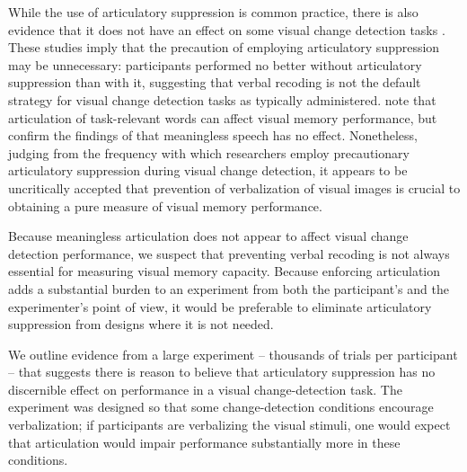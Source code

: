 While the use of articulatory suppression is common practice, there is also evidence that it does not have an effect on some visual change detection tasks \citep{Luria:etal:2010,Morey:Cowan:2004, Morey:Cowan:2005}. These studies imply that the precaution of employing articulatory suppression may be unnecessary: participants performed no better without articulatory suppression than with it, suggesting that verbal recoding is not the default strategy for visual change detection tasks as typically administered. \citet{Mate:etal:2012} note that articulation of task-relevant words can affect visual memory performance, but confirm the findings of \citet{Morey:Cowan:2004} that meaningless speech has no effect. Nonetheless, judging from the frequency with which researchers employ precautionary articulatory suppression during visual change detection, it appears to be uncritically accepted that prevention of verbalization of visual images is crucial to obtaining a pure measure of visual memory performance. 

Because meaningless articulation does not appear to affect visual change detection performance, we suspect that preventing verbal recoding is not always essential for measuring visual memory capacity. Because enforcing articulation adds a substantial burden to an experiment from both the participant's and the experimenter's point of view, it would be preferable to eliminate articulatory suppression from designs where it is not needed. 

We outline evidence from a large experiment -- thousands of trials per participant -- that suggests there is reason to believe that articulatory suppression has no discernible effect on performance in a visual change-detection task. The experiment was designed so that some change-detection conditions encourage verbalization; if participants are verbalizing the visual stimuli, one would expect that articulation would impair performance substantially more in these conditions. 